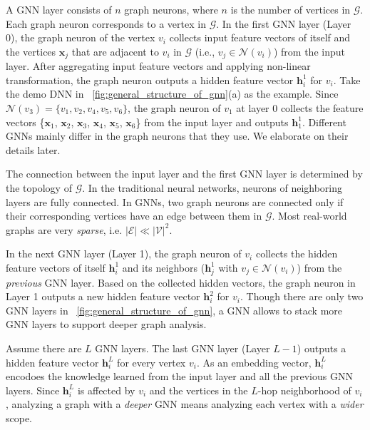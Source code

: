 A GNN layer consists of $n$ graph neurons, where $n$ is the number of vertices in $\mathcal{G}$.
Each graph neuron corresponds to a vertex in $\mathcal{G}$.
In the first GNN layer (Layer 0), the graph neuron of the vertex $v_i$ collects input feature vectors of itself and the vertices $\boldsymbol{x}_j$ that are adjacent to $v_i$ in $\mathcal{G}$ (i.e., $v_j \in \mathcal{N}(v_i)$) from the input layer.
After aggregating input feature vectors and applying non-linear transformation, the graph neuron outputs a hidden feature vector $\boldsymbol{h}^1_i$ for $v_i$.
Take the demo DNN in \figurename~\ref{fig:general_structure_of_gnn}(a) as the example.
Since $\mathcal{N}(v_3) = \{v_1, v_2, v_4, v_5, v_6\}$, the graph neuron of $v_1$ at layer 0 collects the feature vectors \{$\boldsymbol{x}_1$, $\boldsymbol{x}_2$, $\boldsymbol{x}_3$, $\boldsymbol{x}_4$, $\boldsymbol{x}_5$, $\boldsymbol{x}_6$\} from the input layer and outputs $\boldsymbol{h}^1_1$.
Different GNNs mainly differ in the graph neurons that they use.
We elaborate on their details later.

The connection between the input layer and the first GNN layer is determined by the topology of $\mathcal{G}$.
In the traditional neural networks, neurons of neighboring layers are fully connected.
In GNNs, two graph neurons are connected only if their corresponding vertices have an edge between them in $\mathcal{G}$.
Most real-world graphs are very \emph{sparse}, i.e. $|\mathcal{E}| \ll |\mathcal{V}|^2$.


In the next GNN layer (Layer 1), the graph neuron of $v_i$ collects the hidden feature vectors of itself $\boldsymbol{h}^1_i$ and its neighbors ($\boldsymbol{h}^1_j$ with $v_j \in \mathcal{N}(v_i)$) from the \emph{previous} GNN layer.
Based on the collected hidden vectors, the graph neuron in Layer 1 outputs a new hidden feature vector $\boldsymbol{h}^2_i$ for $v_i$.
Though there are only two GNN layers in \figurename~\ref{fig:general_structure_of_gnn}, a GNN allows to stack more GNN layers to support deeper graph analysis.

Assume there are $L$ GNN layers.
The last GNN layer (Layer $L-1$) outputs a hidden feature vector $\boldsymbol{h}^{L}_i$ for every vertex $v_i$.
As an embedding vector, $\boldsymbol{h}^L_i$ encodoes the knowledge learned from the input layer and all the previous GNN layers.
Since $\boldsymbol{h}^L_i$ is affected by $v_i$ and the vertices in the $L$-hop neighborhood of $v_i$, analyzing a graph with a \emph{deeper} GNN means analyzing each vertex with a \emph{wider} scope.

